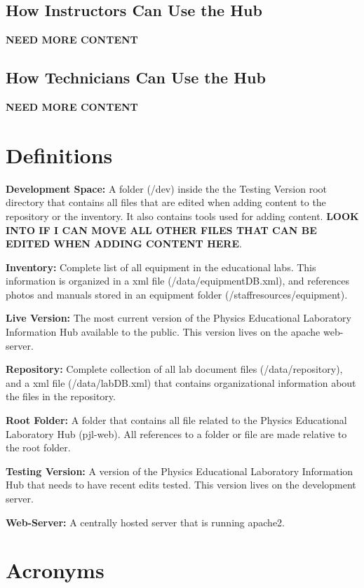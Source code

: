 \documentclass[justified]{LabArx3_5_1}
\begin{document}
\subsection{How Instructors Can Use the Hub}

{\bf NEED MORE CONTENT}


\subsection{How Technicians Can Use the Hub}

{\bf NEED MORE CONTENT}

\section{Definitions}\label{sec:definitions}

{\bf Development Space:} A folder (/dev) inside the the Testing Version root directory that contains all files that are edited when adding content to the repository or the inventory. It also contains tools used for adding content. {\bf LOOK INTO IF I CAN MOVE ALL OTHER FILES THAT CAN BE EDITED WHEN ADDING CONTENT HERE}.

{\bf Inventory:} Complete list of all equipment in the educational labs. This information is organized in a xml file (/data/equipmentDB.xml), and references photos and manuals stored in an equipment folder (/staffresources/equipment). 

{\bf Live Version:} The most current version of the Physics Educational Laboratory Information Hub available to the public. This version lives on the apache web-server. 

{\bf Repository:} Complete collection of all lab document files (/data/repository), and a xml file (/data/labDB.xml) that contains organizational information about the files in the repository.

{\bf Root Folder:} A folder that contains all file related to the Physics Educational Laboratory Hub (pjl-web). All references to a folder or file are made relative to the root folder.

{\bf Testing Version:} A version of the Physics Educational Laboratory Information Hub that needs to have recent edits tested. This version lives on the development server. 

{\bf Web-Server:} A centrally hosted server that is running apache2.

\section{Acronyms}
\end{document}
